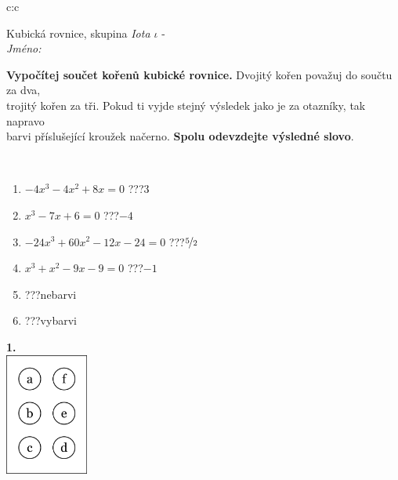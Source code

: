 \documentclass[10pt]{report}
\begin{document}
\begin{tabular}{c:c}
\begin{minipage}[c][104.5mm][t]{0.5\linewidth}
\begin{center}
\vspace{7mm}
{\huge Kubická rovnice, skupina \textit{Iota $\iota$} -}\\[5mm]
\textit{Jméno:}\phantom{xxxxxxxxxxxxxxxxxxxxxxxxxxxxxxxxxxxxxxxxxxxxxxxxxxxxxxxxxxxxxxxxx}\\[5mm]
\begin{minipage}{0.95\linewidth}
\begin{center}
\textbf{Vypočítej součet kořenů kubické rovnice.} Dvojitý kořen považuj do součtu za dva,\\trojitý kořen za tři. Pokud ti vyjde stejný výsledek jako je za otazníky, tak napravo\\barvi příslušející kroužek načerno. \textbf{Spolu odevzdejte výsledné slovo}.
\end{center}
\end{minipage}
\\[1mm]
\begin{minipage}{0.79\linewidth}
\begin{center}
\begin{varwidth}{\linewidth}
\begin{enumerate}
\Large
\item $-4x^3-4x^2+8x=0$\quad \dotfill\; ???\;\dotfill \quad $3$
\item $x^3-7x+6=0$\quad \dotfill\; ???\;\dotfill \quad $-4$
\item $-24x^3+60x^2-12x-24=0$\quad \dotfill\; ???\;\dotfill \quad $\nicefrac{5}{2}$
\item $x^3+x^2-9x-9=0$\quad \dotfill\; ???\;\dotfill \quad $-1$
\item \quad \dotfill\; ???\;\dotfill \quad nebarvi
\item \quad \dotfill\; ???\;\dotfill \quad vybarvi
\end{enumerate}
\end{varwidth}
\end{center}
\end{minipage}
\begin{minipage}{0.20\linewidth}
\begin{center}
{\Huge\bfseries 1.} \\[2mm]
\includegraphics[height=40mm]{../images/braille.png}

\end{center}
\end{minipage}
\end{center}
\end{minipage}
\end{tabular}
\end{document}

